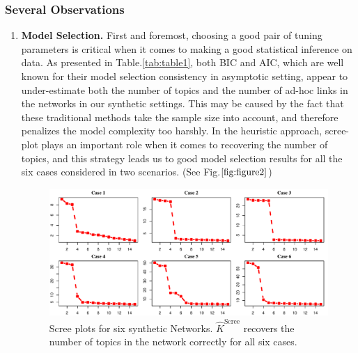 \documentclass[AMS,STIX1COL]{WileyNJD-v2}
\begin{document}
{\subsubsection{Several Observations} \label{sec:obs}
\begin{enumerate}
    \item \textbf{Model Selection.}
    First and foremost, choosing a good pair of tuning parameters is critical when it comes to making a good statistical inference on data.
    As presented in Table.\ref{tab:table1}, both BIC and AIC, which are well known for their model selection consistency in asymptotic setting, appear to under-estimate both the number of topics and the number of ad-hoc links in the networks in our synthetic settings. This may be caused by the fact that these traditional methods take the sample size into account, and therefore penalizes the model complexity too harshly.
    In the heuristic approach, scree-plot plays an important role when it comes to recovering the number of topics, and this strategy leads us to good model selection results for all the six cases considered in two scenarios. (See Fig.$\ref{fig:figure2}$)

    \begin{figure}[htbp]
        \includegraphics[width=1\textwidth]{Fig2.pdf}
        \caption{ Scree plots for six synthetic Networks.
        $\widehat{K}^{\mbox{Scree}}$ recovers the number of topics in the network correctly for all six cases.}
        \label{fig:figure2}
    \end{figure}


\end{enumerate}}
\end{document}
